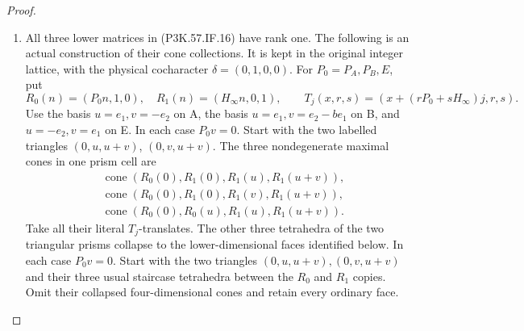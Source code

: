 \begin{proof}
\begin{enumerate}[label=\arabic*.]
\item All three lower matrices in (P3K.57.IF.16) have rank one. The following is an
actual construction of their cone collections. It is kept in the original
integer lattice, with the physical cocharacter \(\delta=(0,1,0,0)\).
For \(P_0=P_A,P_B,E\), put
\[
 R_0(n)=(P_0n,1,0),\quad R_1(n)=(H_\infty n,0,1),\qquad
 T_j(x,r,s)=(x+(rP_0+sH_\infty)j,r,s).                 \tag{P3K.57.IF.24}
\]
Use the basis \(u=e_1,v=-e_2\) on A, the basis
\(u=e_1,v=e_2-be_1\) on B, and \(u=-e_2,v=e_1\) on E.
In each case \(P_0v=0\). Start with the two labelled
triangles \((0,u,u+v)\), \((0,v,u+v)\). The three
nondegenerate maximal cones in one prism cell are
\[
 \begin{split}
 &\operatorname{cone}(R_0(0),R_1(0),R_1(u),R_1(u+v)),\\
 &\operatorname{cone}(R_0(0),R_1(0),R_1(v),R_1(u+v)),\\
 &\operatorname{cone}(R_0(0),R_0(u),R_1(u),R_1(u+v)).
 \end{split}                                             \tag{P3K.57.IF.24a}
\]
Take all their literal \(T_j\)-translates. The other
three tetrahedra of the two triangular prisms collapse
to the lower-dimensional faces identified below.
In each case \(P_0v=0\). Start with the two triangles
\((0,u,u+v),(0,v,u+v)\) and their three usual staircase tetrahedra
between the \(R_0\) and \(R_1\) copies. Omit their collapsed
four-dimensional cones and retain every ordinary face.


\end{enumerate}
\end{proof}
